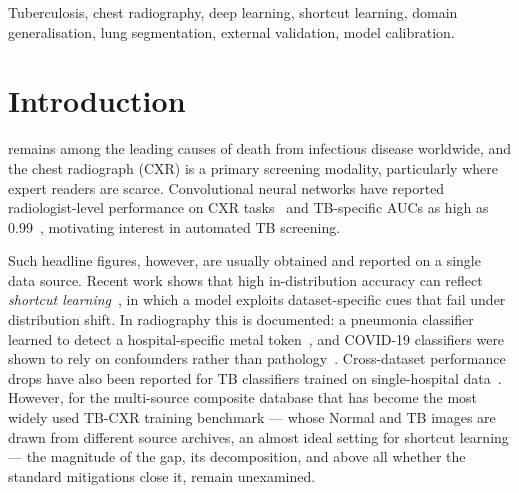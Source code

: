 \documentclass[journal]{IEEEtran}
\begin{document}
\begin{abstract}
three architectures in entirely different orders, and a frozen-feature probe
shows this divergence already exists in the pretrained representations before
any fine-tuning. Segmentation interacts with this dependence in a structured
way: masking significantly degrades the best raw transfer while significantly
recovering the collapsed ones, homogenising all three backbones into a common
0.61--0.77 band well below in-domain performance. We conclude that the TB-CXR
generalisation gap is real, large, and resistant to the standard playbook; that
single-cohort external validation can invert architecture rankings; and that
out-of-source external validation on multiple cohorts must be treated as
mandatory rather than optional.
\end{abstract}

\begin{IEEEkeywords}
Tuberculosis, chest radiography, deep learning, shortcut learning, domain
generalisation, lung segmentation, external validation, model calibration.
\end{IEEEkeywords}

\section{Introduction}

 remains among the leading causes of death from
infectious disease worldwide, and the chest radiograph (CXR) is a primary
screening modality, particularly where expert readers are scarce. Convolutional
neural networks have reported radiologist-level performance on CXR
tasks~\cite{rajpurkar2017chexnet} and TB-specific AUCs as high as
0.99~\cite{lakhani2017deep}, motivating interest in automated TB screening.

Such headline figures, however, are usually obtained and reported on a single
data source. Recent work shows that high in-distribution accuracy can reflect
\emph{shortcut learning}~\cite{geirhos2020shortcut}, in which a model exploits
dataset-specific cues that fail under distribution shift. In radiography this
is documented: a pneumonia classifier learned to detect a hospital-specific
metal token~\cite{zech2018variable}, and COVID-19 classifiers were shown to
rely on confounders rather than pathology~\cite{degrave2021ai}. Cross-dataset
performance drops have also been reported for TB classifiers trained on
single-hospital data~\cite{sathitratanacheewin2020deep, karki2022generalization,
shuaibu2026geographic}. However, for the multi-source composite database that
has become the most widely used TB-CXR training benchmark --- whose Normal and
TB images are drawn from different source archives, an almost ideal setting for
shortcut learning --- the magnitude of the gap, its decomposition, and above
all whether the standard mitigations close it, remain unexamined.
\end{document}
